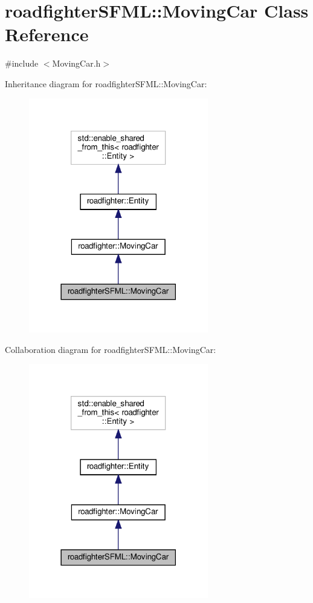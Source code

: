 \hypertarget{classroadfighterSFML_1_1MovingCar}{}\section{roadfighter\+S\+F\+ML\+:\+:Moving\+Car Class Reference}
\label{classroadfighterSFML_1_1MovingCar}


{\ttfamily \#include $<$Moving\+Car.\+h$>$}



Inheritance diagram for roadfighter\+S\+F\+ML\+:\+:Moving\+Car\+:\nopagebreak
\begin{figure}[H]
\begin{center}
\leavevmode
\includegraphics[width=222pt]{classroadfighterSFML_1_1MovingCar__inherit__graph}
\end{center}
\end{figure}


Collaboration diagram for roadfighter\+S\+F\+ML\+:\+:Moving\+Car\+:\nopagebreak
\begin{figure}[H]
\begin{center}
\leavevmode
\includegraphics[width=222pt]{classroadfighterSFML_1_1MovingCar__coll__graph}
\end{center}
\end{figure}

